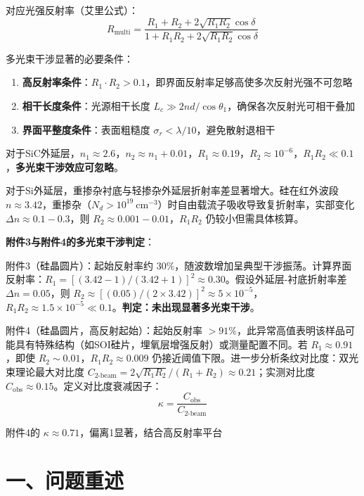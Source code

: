 \documentclass{mcmthesis}
\begin{document}
对应光强反射率（艾里公式）：
$$R_{\text{multi}} = \frac{R_1 + R_2 + 2\sqrt{R_1R_2}\cos\delta}{1 + R_1R_2 + 2\sqrt{R_1R_2}\cos\delta} \tag{22}$$

多光束干涉显著的必要条件：
\begin{enumerate}
    \item \textbf{高反射率条件}：$R_1 \cdot R_2 > 0.1$，即界面反射率足够高使多次反射光强不可忽略
    \item \textbf{相干长度条件}：光源相干长度 $L_c \gg 2nd/\cos\theta_1$，确保各次反射光可相干叠加
    \item \textbf{界面平整度条件}：表面粗糙度 $\sigma_r < \lambda/10$，避免散射退相干
\end{enumerate}

对于SiC外延层，$n_1 \approx 2.6$，$n_2 \approx n_1 + 0.01$，$R_1 \approx 0.19$，$R_2 \approx 10^{-6}$，$R_1R_2 \ll 0.1$，\textbf{多光束干涉效应可忽略}。

对于Si外延层，重掺杂衬底与轻掺杂外延层折射率差显著增大。硅在红外波段 $n \approx 3.42$，重掺杂（$N_d > 10^{19}\ \text{cm}^{-3}$）时自由载流子吸收导致复折射率，实部变化 $\Delta n \approx 0.1-0.3$，则 $R_2 \approx 0.001-0.01$，$R_1R_2$ 仍较小但需具体核算。

\textbf{附件3与附件4的多光束干涉判定}：

附件3（硅晶圆片）：起始反射率约 $30\%$，随波数增加呈典型干涉振荡。计算界面反射率：$R_1 = [(3.42-1)/(3.42+1)]^2 \approx 0.30$。假设外延层-衬底折射率差 $\Delta n = 0.05$，则 $R_2 \approx [(0.05)/(2\times3.42)]^2 \approx 5\times 10^{-5}$，$R_1R_2 \approx 1.5\times 10^{-5} \ll 0.1$。\textbf{判定：未出现显著多光束干涉}。

附件4（硅晶圆片，高反射起始）：起始反射率 $>91\%$，此异常高值表明该样品可能具有特殊结构（如SOI硅片，埋氧层增强反射）或测量配置不同。若 $R_1 \approx 0.91$，即使 $R_2 \sim 0.01$，$R_1R_2 \approx 0.009$ 仍接近阈值下限。进一步分析条纹对比度：双光束理论最大对比度 $C_{\text{2-beam}} = 2\sqrt{R_1R_2}/(R_1+R_2) \approx 0.21$；实测对比度 $C_{\text{obs}} \approx 0.15$。定义对比度衰减因子：
$$\kappa = \frac{C_{\text{obs}}}{C_{\text{2-beam}}} \tag{23}$$

附件4的 $\kappa \approx 0.71$，偏离1显著，结合高反射率平台


\section{ 一、问题重述}
\end{document}
